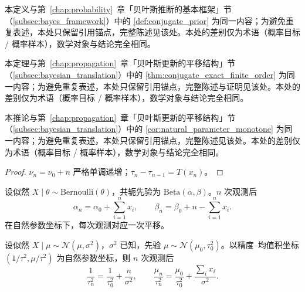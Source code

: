 \begin{definition}[共轭先验]\label{def:conjugate_prior_prob}
本定义与第~\ref{chap:probability}~章「贝叶斯推断的基本框架」节（\cref{subsec:bayes_framework}）中的 \cref{def:conjugate_prior} 为同一内容；为避免重复表述，本处只保留引用锚点，完整陈述见该处。本处的差别仅为术语（概率目标 / 概率样本），数学对象与结论完全相同。
\end{definition}

\begin{theorem}[共轭先验下贝叶斯更新的精确有限阶平移]\label{thm:conjugate_exact_finite_order_prob}
本定理与第~\ref{chap:propagation}~章「贝叶斯更新的平移结构」节（\cref{subsec:bayesian_translation}）中的 \cref{thm:conjugate_exact_finite_order} 为同一内容；为避免重复表述，本处只保留引用锚点，完整陈述与证明见该处。本处的差别仅为术语（概率目标 / 概率样本），数学对象与结论完全相同。
\end{theorem}

\begin{corollary}[自然参数的单调累积]\label{cor:natural_param_monotone_prob}
本推论与第~\ref{chap:propagation}~章「贝叶斯更新的平移结构」节（\cref{subsec:bayesian_translation}）中的 \cref{cor:natural_parameter_monotone} 为同一内容；为避免重复表述，本处只保留引用锚点，完整陈述见该处。本处的差别仅为术语（概率目标 / 概率样本），数学对象与结论完全相同。
\end{corollary}

\begin{proof}
$\nu_n=\nu_0+n$ 严格单调递增；$\tau_n-\tau_{n-1}=T(x_n)$。
\end{proof}

\begin{example}\label{ex:beta_binomial_prob}
设似然 $X\mid\theta\sim\mathrm{Bernoulli}(\theta)$，共轭先验为 $\mathrm{Beta}(\alpha,\beta)$。$n$ 次观测后
\[
\alpha_n=\alpha_0+\sum_{i=1}^nx_i,\qquad \beta_n=\beta_0+n-\sum_{i=1}^nx_i.
\]
在自然参数坐标下，每次观测对应一次平移。
\end{example}

\begin{example}\label{ex:gaussian_gaussian_prob}
设似然 $X\mid\mu\sim\mathcal N(\mu,\sigma^2)$，$\sigma^2$ 已知，先验 $\mu\sim\mathcal N(\mu_0,\tau_0^2)$。以精度--均值积坐标 $(1/\tau^2,\mu/\tau^2)$ 为自然参数坐标，则 $n$ 次观测后
\[
\frac{1}{\tau_n^2}=\frac{1}{\tau_0^2}+\frac{n}{\sigma^2},\qquad
\frac{\mu_n}{\tau_n^2}=\frac{\mu_0}{\tau_0^2}+\frac{\sum_ix_i}{\sigma^2}.
\]
\end{example}

